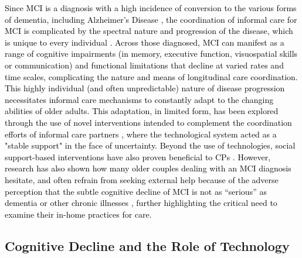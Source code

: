 \documentclass[acmsmall]{acmart}
\begin{document}
\textcolor{black}{Since MCI is a diagnosis with a high incidence of conversion to the various forms of dementia, including Alzheimer’s Disease \cite{fischer2007conversion}, the coordination of informal care for MCI is complicated by the spectral nature and progression of the disease, which is unique \textcolor{black}{to} every individual \cite{busse2006mild, anderson2019state, hedman2013patterns}. Across \textcolor{black}{those} diagnosed, MCI can manifest  as a range of cognitive impairments (in memory, executive function, visuospatial skills or communication) and functional limitations that decline at varied rates and time scales, complicating the nature and means of \textcolor{black}{longitudinal} care coordination. This highly individual (and often unpredictable) nature of disease progression necessitates informal care mechanisms to constantly adapt to the changing abilities of older adults. This adaptation, in limited form, has been explored through the use of novel interventions intended to complement the coordination efforts of informal care partners \cite{mathur2022collaborative, zubatiy2021empowering}, where the technological system acted as a "stable support" in the face of uncertainty. Beyond the use of technologies, social support-based interventions have also proven beneficial \textcolor{black}{to} CPs \cite{lydon2022integrative, dean2012living}. However, research has also shown how many older couples dealing with an MCI diagnosis hesitate, and often refrain from seeking external help because of the adverse perception that the subtle cognitive decline of MCI is not as “serious” as dementia or other chronic illnesses \cite{madjaroff2017narratives, adams2006transition}, further highlighting the critical need to examine their in-home practices for care.} 

\subsection{Cognitive Decline and the Role of Technology}
\end{document}
